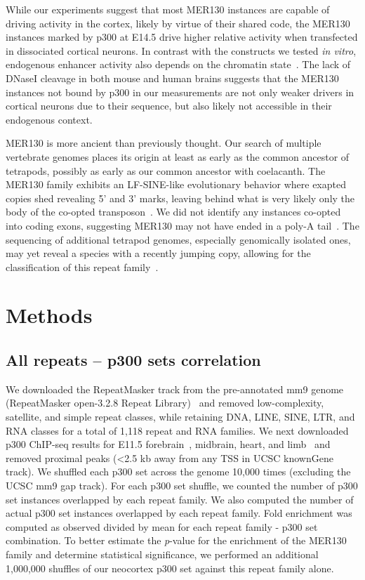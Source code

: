 While our experiments suggest that most MER130 instances are capable of
driving activity in the cortex, likely by virtue of their shared code,
the MER130 instances marked by p300 at E14.5 drive higher relative
activity when transfected in dissociated cortical neurons. In contrast
with the constructs we tested \emph{in vitro}, endogenous enhancer
activity also depends on the chromatin state~\citep{Arnold:2013di}. The
lack of DNaseI cleavage in both mouse and human brains suggests that the
MER130 instances not bound by p300 in our measurements are not only
weaker drivers in cortical neurons due to their sequence, but also
likely not accessible in their endogenous context.

MER130 is more ancient than previously thought. Our search of multiple
vertebrate genomes places its origin at least as early as the common
ancestor of tetrapods, possibly as early as our common ancestor with
coelacanth. The MER130 family exhibits an LF-SINE-like evolutionary
behavior where exapted copies shed revealing 5' and 3' marks, leaving
behind what is very likely only the body of the co-opted
transposon~\citep{Bejerano:2006ep}. We did not identify any instances
co-opted into coding exons, suggesting MER130 may not have ended in a
poly-A tail~\citep{Bejerano:2006ep}. The sequencing of additional tetrapod
genomes, especially genomically isolated ones, may yet reveal a species
with a recently jumping copy, allowing for the classification of this
repeat family~\citep{Lowe:2010ka}.

\section{Methods}
\label{sec:mer130Methods}

\subsection{All repeats -- p300 sets
correlation}\label{all-repeats-p300-sets-correlation}

We downloaded the RepeatMasker track from the pre-annotated mm9 genome
(RepeatMasker open-3.2.8 Repeat Library)~\citep{Smit:OL9JT8qH} and
removed low-complexity, satellite, and simple repeat classes, while
retaining DNA, LINE, SINE, LTR, and RNA classes for a total of 1,118
repeat and RNA families. We next downloaded p300 ChIP-seq results for
E11.5 forebrain~\citep{Visel:2013it}, midbrain, heart, and
limb~\citep{Blow:2010bu} and removed proximal peaks (\textless{}2.5 kb
away from any TSS in UCSC knownGene track). We shuffled each p300 set
across the genome 10,000 times (excluding the UCSC mm9 gap track). For
each p300 set shuffle, we counted the number of p300 set instances
overlapped by each repeat family. We also computed the number of actual
p300 set instances overlapped by each repeat family. Fold enrichment was
computed as observed divided by mean for each repeat family - p300 set
combination. To better estimate the \emph{p}-value for the enrichment of the
MER130 family and determine statistical significance, we performed an
additional 1,000,000 shuffles of our neocortex p300 set against this
repeat family alone.


